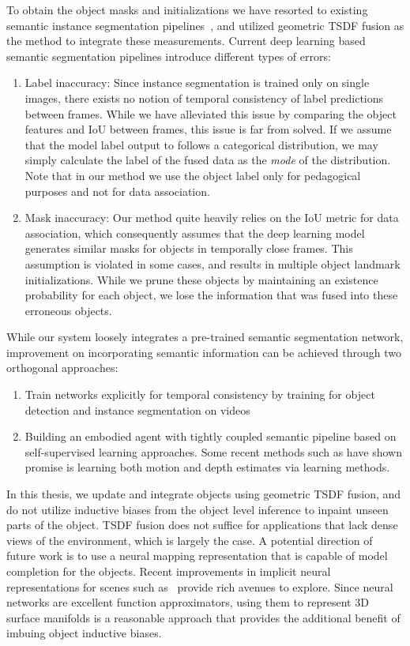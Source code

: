 To obtain the object masks and initializations we have resorted to existing semantic instance segmentation pipelines~\cite{kirillovPointRendImageSegmentation2020}, and utilized geometric TSDF fusion as the method to integrate these measurements. Current deep learning based semantic segmentation pipelines introduce different types of errors:
\begin{enumerate}
    \item Label inaccuracy: Since instance segmentation is trained only on single images, there exists no notion of temporal consistency of label predictions between frames. While we have alleviated this issue by comparing the object features and IoU between frames, this issue is far from solved. If we assume that the model label output to follows a categorical distribution, we may simply calculate the label of the fused data as the \emph{mode} of the distribution. Note that in our method we use the object label only for pedagogical purposes and not for data association.
    \item Mask inaccuracy: Our method quite heavily relies on the IoU metric for data association, which consequently assumes that the deep learning model generates similar masks for objects in temporally close frames. This assumption is violated in some cases, and results in multiple object landmark initializations. While we prune these objects by maintaining an existence probability for each object, we lose the information that was fused into these erroneous objects.
\end{enumerate}

While our system loosely integrates a pre-trained semantic segmentation network, improvement on incorporating semantic information can be achieved through two orthogonal approaches:
\begin{enumerate}
    \item Train networks explicitly for temporal consistency by training for object detection and instance segmentation on videos
    \item Building an embodied agent with tightly coupled semantic pipeline based on self-supervised learning approaches. Some recent methods such as \cite{chengGeometryAwareRecurrentNeural2018, teedDeepV2DVideoDepth2020} have shown promise is learning both motion and depth estimates via learning methods.
\end{enumerate}

In this thesis, we update and integrate objects using geometric TSDF fusion, and do not utilize inductive biases from the object level inference to inpaint unseen parts of the object. TSDF fusion does not suffice for applications that lack dense views of the environment, which is largely the case. A potential direction of future work is to use a neural mapping representation that is capable of model completion for the objects. Recent improvements in implicit neural representations for scenes such as~\cite{parkDeepSDFLearningContinuous2019, mildenhallNeRFRepresentingScenes2020} provide rich avenues to explore. Since neural networks are excellent function approximators, using them to represent 3D surface manifolds is a reasonable approach that provides the additional benefit of imbuing object inductive biases.



